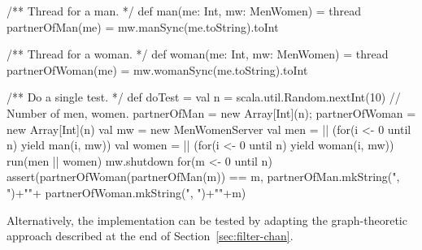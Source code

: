 \begin{answerI}
\begin{scala}
  /** Thread for a man. */
  def man(me: Int, mw: MenWomen) = thread{
    partnerOfMan(me) = mw.manSync(me.toString).toInt
  }

  /** Thread for a woman. */
  def woman(me: Int, mw: MenWomen) = thread{
    partnerOfWoman(me) = mw.womanSync(me.toString).toInt
  }

  /** Do a single test. */
  def doTest = {
    val n = scala.util.Random.nextInt(10) // Number of men, women.
    partnerOfMan = new Array[Int](n); partnerOfWoman = new Array[Int](n)
    val mw = new MenWomenServer 
    val men = || (for(i <- 0 until n) yield man(i, mw))
    val women = || (for(i <- 0 until n) yield woman(i, mw))
    run(men || women)
    mw.shutdown
    for(m <- 0 until n)
      assert(partnerOfWoman(partnerOfMan(m)) == m,
             partnerOfMan.mkString(", ")+"\n"+
               partnerOfWoman.mkString(", ")+"\n"+m)
  }
\end{scala}

Alternatively, the implementation can be tested by adapting the
graph-theoretic approach described at the end of
Section~\ref{sec:filter-chan}. 
\end{answerI}
% 








